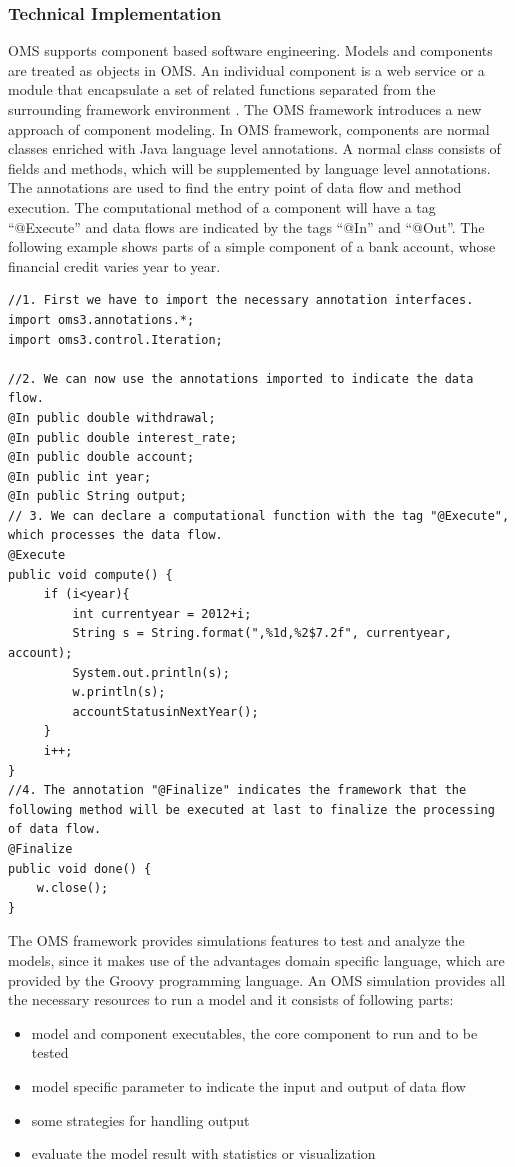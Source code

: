 \subsubsection{Technical Implementation}
\par
OMS supports component based software engineering. Models and components are treated as objects in OMS. An individual component is a web service or a module that encapsulate a set of related functions separated from the surrounding framework environment \autocite{dsl:oms-component_based}. The OMS framework introduces a new approach of component modeling. In OMS framework, components are normal classes enriched with Java language level annotations. A normal class consists of fields and methods, which will be supplemented by language level annotations. The annotations are used to find the entry point of data flow and method execution. The computational method of a component will have a tag “@Execute” and data flows are indicated by the tags “@In” and “@Out”.
The following example shows parts of a simple component of a bank account, whose financial credit varies year to year.
\begin{lstlisting}
//1. First we have to import the necessary annotation interfaces.
import oms3.annotations.*;
import oms3.control.Iteration;

//2. We can now use the annotations imported to indicate the data flow.
@In public double withdrawal;
@In public double interest_rate;
@In public double account;
@In public int year;
@In public String output;
// 3. We can declare a computational function with the tag "@Execute", which processes the data flow.
@Execute
public void compute() {
	 if (i<year){
		 int currentyear = 2012+i;
		 String s = String.format(",%1d,%2$7.2f", currentyear, account);
		 System.out.println(s);
		 w.println(s);
		 accountStatusinNextYear();
	 }
	 i++;
}
//4. The annotation "@Finalize" indicates the framework that the following method will be executed at last to finalize the processing of data flow.
@Finalize
public void done() {
	w.close();
}
\end{lstlisting}
\par
The OMS framework provides simulations features to test and analyze the models, since it makes use of the advantages domain specific language, which are provided by the Groovy programming language. An OMS simulation provides all the necessary resources to run a model and it consists of following parts:
\begin{itemize}
  \item model and component executables, the core component to run and to be tested	
  \item model specific parameter to indicate the input and output of data flow
  \item some strategies for handling output	
  \item evaluate the model result with statistics or visualization
\end{itemize}
